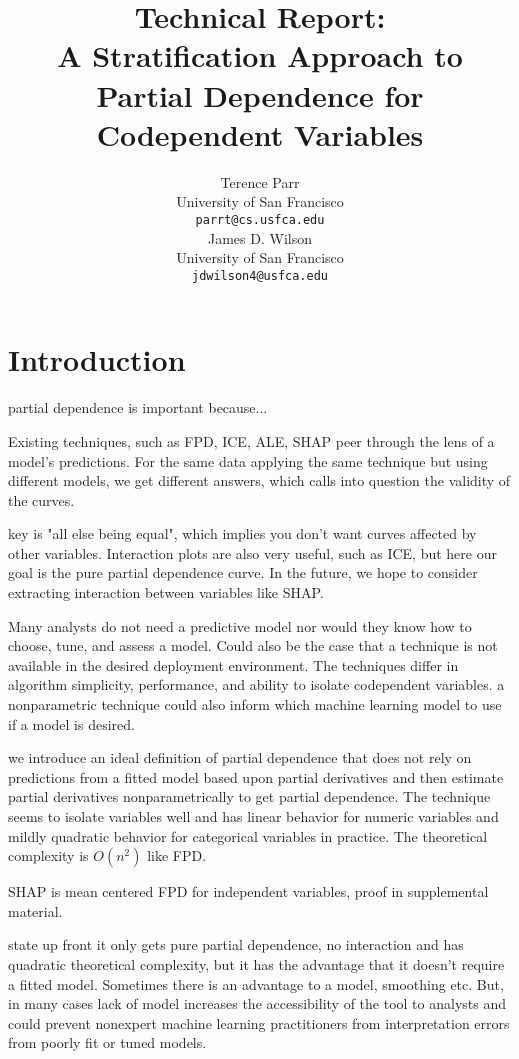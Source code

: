 \documentclass{article}
\title{Technical Report:\\
A Stratification Approach to Partial Dependence for Codependent Variables}
\author{%
  Terence Parr \\
  University of San Francisco\\
  \texttt{parrt@cs.usfca.edu} \\
  \And
  James D. Wilson \\
  University of San Francisco\\
  \texttt{jdwilson4@usfca.edu} \\
}
\begin{document}
\maketitle

\begin{abstract}
\end{abstract}

\section{Introduction}

partial dependence is important because...

Existing techniques, such as FPD, ICE, ALE, SHAP peer through the lens of a model's predictions. For the same data applying the same technique but using different models, we get different answers, which calls into question the validity of the curves.

key is "all else being equal", which implies you don't want curves affected by other variables. Interaction plots are also very useful, such as ICE, but here our goal is the pure partial dependence curve. In the future, we hope to consider extracting interaction between variables like SHAP.

Many analysts do not need a predictive model nor would they know how to choose, tune, and assess a model. Could also be the case that a technique is not available in the desired deployment environment.  The techniques differ in algorithm simplicity, performance, and ability to isolate codependent variables. a nonparametric technique could also inform which machine learning model to use if a model is desired.

we introduce an ideal definition of partial dependence that does not rely on predictions from a fitted model based upon partial derivatives and then estimate partial derivatives nonparametrically to get partial dependence. The technique seems to isolate variables well and has linear behavior for numeric variables and mildly quadratic behavior for categorical variables in practice. The theoretical complexity is $O(n^2)$ like FPD.

SHAP is mean centered FPD for independent variables, proof in supplemental material.

state up front it only gets pure partial dependence, no interaction and has quadratic theoretical complexity, but it has the advantage that it doesn't require a fitted model.  Sometimes there is an advantage to a model, smoothing etc. But, in many cases lack of model increases the accessibility of the tool to analysts and could prevent nonexpert machine learning practitioners from interpretation errors from poorly fit or tuned models.
\end{document}
